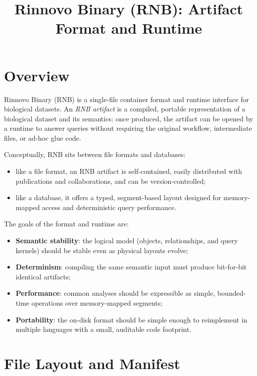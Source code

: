 \documentclass[11pt]{article}
\title{Rinnovo Binary (RNB): Artifact Format and Runtime}
\author{}
\date{}
\begin{document}
\maketitle

\section{Overview}

Rinnovo Binary (RNB) is a single-file container format and runtime
interface for biological datasets. An \emph{RNB artifact} is a compiled,
portable representation of a biological dataset and its semantics:
once produced, the artifact can be opened by a runtime to answer
queries without requiring the original workflow, intermediate files,
or ad-hoc glue code.

Conceptually, RNB sits between file formats and databases:
\begin{itemize}
  \item like a file format, an RNB artifact is self-contained, easily
        distributed with publications and collaborations, and can be
        version-controlled;
  \item like a database, it offers a typed, segment-based layout
        designed for memory-mapped access and deterministic query
        performance.
\end{itemize}

The goals of the format and runtime are:
\begin{itemize}
  \item \textbf{Semantic stability}: the logical model (objects,
        relationships, and query kernels) should be stable even as
        physical layouts evolve;
  \item \textbf{Determinism}: compiling the same semantic input must
        produce bit-for-bit identical artifacts;
  \item \textbf{Performance}: common analyses should be expressible as
        simple, bounded-time operations over memory-mapped segments;
  \item \textbf{Portability}: the on-disk format should be simple
        enough to reimplement in multiple languages with a small,
        auditable code footprint.
\end{itemize}

\section{File Layout and Manifest}
\end{document}
